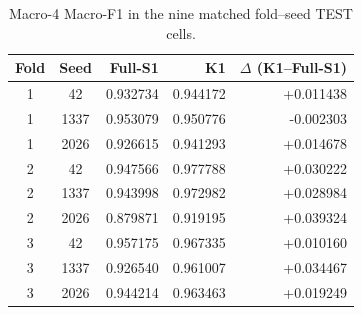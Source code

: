 \begin{table}[t]
\centering
\caption{Macro-4 Macro-F1 in the nine matched fold--seed TEST cells.}
\label{tab:matched_cells}
\small
\begin{tabular}{ccrrr}
\toprule
Fold & Seed & Full-S1 & K1 & $\Delta$ (K1--Full-S1) \\
\midrule
1 & 42   & 0.932734 & 0.944172 & +0.011438 \\
1 & 1337 & 0.953079 & 0.950776 & -0.002303 \\
1 & 2026 & 0.926615 & 0.941293 & +0.014678 \\
2 & 42   & 0.947566 & 0.977788 & +0.030222 \\
2 & 1337 & 0.943998 & 0.972982 & +0.028984 \\
2 & 2026 & 0.879871 & 0.919195 & +0.039324 \\
3 & 42   & 0.957175 & 0.967335 & +0.010160 \\
3 & 1337 & 0.926540 & 0.961007 & +0.034467 \\
3 & 2026 & 0.944214 & 0.963463 & +0.019249 \\
\bottomrule
\end{tabular}
\end{table}
